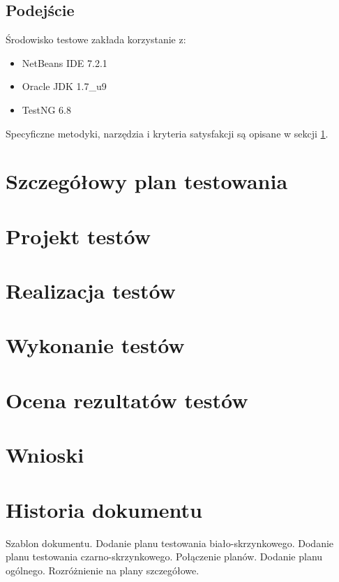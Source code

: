 \documentclass[10pt]{dokument-tiwo}
\begin{document}
\subsection{Podejście}
Środowisko testowe zakłada korzystanie z:
\begin{itemize}
    \item NetBeans IDE 7.2.1
    \item Oracle JDK 1.7\_u9
    \item TestNG 6.8
\end{itemize}

\noindent
Specyficzne metodyki, narzędzia i kryteria satysfakcji są opisane w sekcji
\ref{sec:szczegolowy_plan}.


\section{Szczegółowy plan testowania}
\label{sec:szczegolowy_plan}




\section{Projekt testów}
\label{sec:projekt}



\section{Realizacja testów}


\section{Wykonanie testów}


\section{Ocena rezultatów testów}


\section{Wnioski}


\newpage
\section*{Historia dokumentu}
\begin{versions}
        Szablon dokumentu.
        Dodanie planu testowania biało-skrzynkowego.
        Dodanie planu testowania czarno-skrzynkowego.
        Połączenie planów. Dodanie planu ogólnego. Rozróżnienie na plany
        szczegółowe.
\end{versions}
\end{document}
